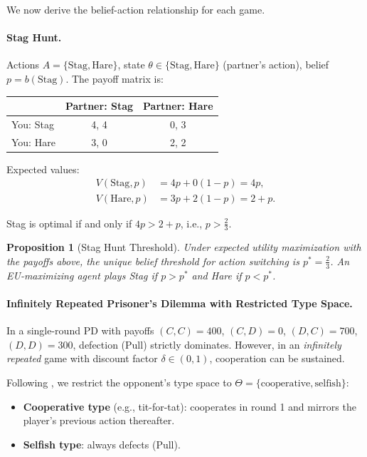 \documentclass[12pt]{article}
\newtheorem{proposition}{Proposition}
\begin{document}
We now derive the belief-action relationship for each game.

\paragraph{Stag Hunt.}
Actions $A = \{\text{Stag}, \text{Hare}\}$, state $\theta \in \{\text{Stag}, \text{Hare}\}$ (partner's action), belief $p = b(\text{Stag})$. The payoff matrix is:

\begin{center}
\begin{tabular}{lcc}
\toprule
& Partner: Stag & Partner: Hare \\
\midrule
You: Stag & 4, 4 & 0, 3 \\
You: Hare & 3, 0 & 2, 2 \\
\bottomrule
\end{tabular}
\end{center}

Expected values:
\begin{align}
    V(\text{Stag}, p) &= 4p + 0(1-p) = 4p, \label{eq:sh_stag} \\
    V(\text{Hare}, p) &= 3p + 2(1-p) = 2 + p. \label{eq:sh_hare}
\end{align}

Stag is optimal if and only if $4p > 2 + p$, i.e., $p > \frac{2}{3}$.

\begin{proposition}[Stag Hunt Threshold]
\label{prop:sh_threshold}
Under expected utility maximization with the payoffs above, the unique belief threshold for action switching is $p^* = \frac{2}{3}$. An EU-maximizing agent plays Stag if $p > p^*$ and Hare if $p < p^*$.
\end{proposition}

\paragraph{Infinitely Repeated Prisoner's Dilemma with Restricted Type Space.}
In a single-round PD with payoffs $(C,C)=400$, $(C,D)=0$, $(D,C)=700$, $(D,D)=300$, defection (Pull) strictly dominates. However, in an \emph{infinitely repeated} game with discount factor $\delta \in (0,1)$, cooperation can be sustained.

Following \citet{kreps1982rational}, we restrict the opponent's type space to $\Theta = \{\text{cooperative}, \text{selfish}\}$:
\begin{itemize}[nosep]
    \item \textbf{Cooperative type} (e.g., tit-for-tat): cooperates in round 1 and mirrors the player's previous action thereafter.
    \item \textbf{Selfish type}: always defects (Pull).
\end{itemize}
\end{document}

